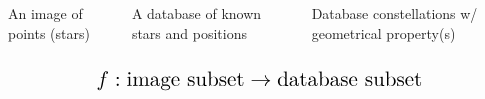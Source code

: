 \documentclass[10pt,xcolor={dvipsnames,svgnames}]{beamer}
\begin{document}
\begin{frame}
		\begin{columns}
		\begin{column}{0.3\textwidth}
			\parbox{\textwidth}{
				An image of points (stars)
			}
		\end{column}
		\begin{column}{0.3\textwidth}
			\parbox{\linewidth}{
				A database of known stars and positions
			}
		\end{column}
		\begin{column}{0.3\textwidth}
			\parbox{\linewidth}{
				Database constellations w/ geometrical property(s)
			}
		\end{column}
		\end{columns}
		\medskip

		
		\begin{columns}
		\begin{column}{0.3\textwidth}
			\centering{$\Bigg\downarrow$} 
		\end{column}
		\begin{column}{0.3\textwidth}
			\centering{$\Bigg\downarrow$} 
		\end{column}
		\begin{column}{0.3\textwidth}
			\centering{$\Bigg\downarrow$} 
		\end{column}
		\end{columns}
		
		\vspace*{2em}
		\begin{equation*}
			\scalebox{1.5} {
				$f : \text{image subset} \rightarrow \text{database subset}$
			}
		\end{equation*}
	\end{frame}
	\note{}
\end{document}
